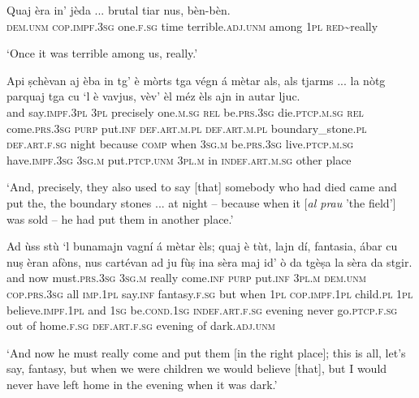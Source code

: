 \begin{linenumbers}
\gll Quaj èra in’ jèda ... brutal tiar nus, bèn-bèn.   \\
\textsc{dem.unm} \textsc{cop.impf.3sg} one.\textsc{f.sg} time {} terrible.\textsc{adj.unm} among \textsc{1pl} \textsc{red}\textasciitilde{really}\\
\end{linenumbers}
\medskip
\glt `Once it was terrible among us, really.'
\medskip

\begin{linenumbers}
\gll  Api ṣchèvan aj èba in tg’ è mòrts tga végn á mètar als, als tjarms ... la nòtg parquaj tga cu `l è vavjus, vèv’ èl méz èls ajn in autar ljuc.  \\
and say.\textsc{impf.3pl} \textsc{3pl} precisely one.\textsc{m.sg} \textsc{rel} be.\textsc{prs.3sg} die.\textsc{ptcp.m.sg} \textsc{rel} come.\textsc{prs.3sg} \textsc{purp} put.\textsc{inf} \textsc{def.art.m.pl} \textsc{def.art.m.pl} boundary\_stone.\textsc{pl} {} \textsc{def.art.f.sg} night because \textsc{comp} when \textsc{3sg.m} be.\textsc{prs.3sg} live.\textsc{ptcp.m.sg} have.\textsc{impf.3sg} \textsc{3sg.m} put.\textsc{ptcp.unm} \textsc{3pl.m} in \textsc{indef.art.m.sg} other place \\
\end{linenumbers}
\medskip
\glt `And, precisely, they also used to say [that] somebody who had died came and put the, the boundary stones ... at night – because when it [\textit{al prau} 'the field'] was sold – he had put them in another place.'
\medskip

\begin{linenumbers}
\gll Ad ùss stù `l bunamajn vagní á mètar èls; quaj è tùt, lajn dí, fantasia, ábar cu nuṣ èran afòns, nus cartévan ad ju fùṣ ina sèra maj id’ ò da tgèṣa la sèra da stgir. \\
and now must.\textsc{prs.3sg} \textsc{3sg.m} really come.\textsc{inf} \textsc{purp} put.\textsc{inf} \textsc{3pl.m} \textsc{dem.unm} \textsc{cop.prs.3sg} all \textsc{imp.1pl} say.\textsc{inf} fantasy.\textsc{f.sg} but when \textsc{1pl} \textsc{cop.impf.1pl} child.\textsc{pl} \textsc{1pl} believe.\textsc{impf.1pl} and \textsc{1sg} be.\textsc{cond.1sg} \textsc{indef.art.f.sg} evening never go.\textsc{ptcp.f.sg} out of home.\textsc{f.sg} \textsc{def.art.f.sg} evening of dark.\textsc{adj.unm}\\
  \end{linenumbers}
\medskip
\glt `And now he must really come and put them [in the right place]; this is all, let’s say, fantasy, but when we were children we would believe [that], but I would never have left home in the evening when it was dark.'
\medskip

